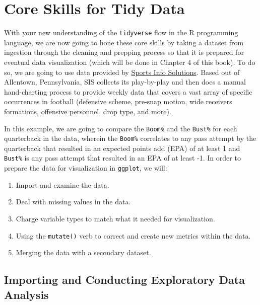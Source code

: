 \documentclass[
  letterpaper,
]{krantz}
\providecommand{\tightlist}{%
  \setlength{\itemsep}{0pt}\setlength{\parskip}{0pt}}\usepackage{longtable,booktabs,array}
\begin{document}
\hypertarget{core-skills-for-tidy-data}{%
\section{Core Skills for Tidy Data}\label{core-skills-for-tidy-data}}

With your new understanding of the \texttt{tidyverse} flow in the R
programming language, we are now going to hone these core skills by
taking a dataset from ingestion through the cleaning and prepping
process so that it is prepared for eventual data visualization (which
will be done in Chapter 4 of this book). To do so, we are going to use
data provided by \href{https://www.sportsinfosolutions.com/}{Sports Info
Solutions}. Based out of Allentown, Pennsylvania, SIS collects its
play-by-play and then does a manual hand-charting process to provide
weekly data that covers a vast array of specific occurrences in football
(defensive scheme, pre-snap motion, wide receivers formations, offensive
personnel, drop type, and more).

In this example, we are going to compare the \texttt{Boom\%} and the
\texttt{Bust\%} for each quarterback in the data, wherein the
\texttt{Boom\%} correlates to any pass attempt by the quarterback that
resulted in an expected points add (EPA) of at least 1 and
\texttt{Bust\%} is any pass attempt that resulted in an EPA of at least
-1. In order to prepare the data for visualization in \texttt{ggplot},
we will:

\begin{enumerate}
\def\labelenumi{\arabic{enumi}.}
\tightlist
\item
  Import and examine the data.
\item
  Deal with missing values in the data.
\item
  Charge variable types to match what it needed for visualization.
\item
  Using the \texttt{mutate()} verb to correct and create new metrics
  within the data.
\item
  Merging the data with a secondary dataset.
\end{enumerate}

\hypertarget{importing-and-conducting-exploratory-data-analysis}{%
\subsection{Importing and Conducting Exploratory Data
Analysis}\label{importing-and-conducting-exploratory-data-analysis}}
\end{document}
